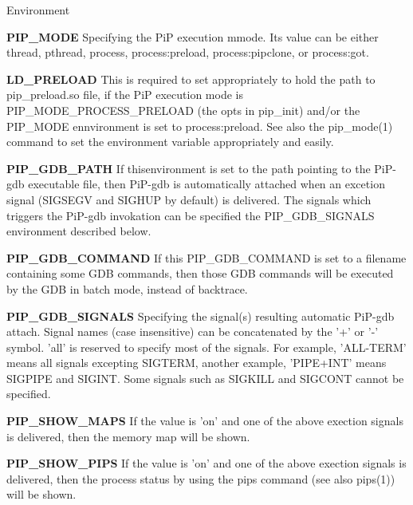 \documentclass[twoside]{book}
\begin{document}
\begin{DoxyParagraph}{Environment}
\begin{DoxyItemize}
\item {\bfseries P\-I\-P\-\_\-\-M\-O\-D\-E} Specifying the Pi\-P execution mmode. Its value can be either {\ttfamily thread}, {\ttfamily pthread}, {\ttfamily process}, {\ttfamily process\-:preload}, {\ttfamily process\-:pipclone}, or {\ttfamily process\-:got}. \item {\bfseries L\-D\-\_\-\-P\-R\-E\-L\-O\-A\-D} This is required to set appropriately to hold the path to {\ttfamily pip\-\_\-preload.\-so} file, if the Pi\-P execution mode is {\ttfamily P\-I\-P\-\_\-\-M\-O\-D\-E\-\_\-\-P\-R\-O\-C\-E\-S\-S\-\_\-\-P\-R\-E\-L\-O\-A\-D} (the {\ttfamily opts} in {\ttfamily pip\-\_\-init}) and/or the P\-I\-P\-\_\-\-M\-O\-D\-E ennvironment is set to {\ttfamily process\-:preload}. See also the pip\-\_\-mode(1) command to set the environment variable appropriately and easily. \item {\bfseries P\-I\-P\-\_\-\-G\-D\-B\-\_\-\-P\-A\-T\-H} If thisenvironment is set to the path pointing to the Pi\-P-\/gdb executable file, then Pi\-P-\/gdb is automatically attached when an excetion signal (S\-I\-G\-S\-E\-G\-V and S\-I\-G\-H\-U\-P by default) is delivered. The signals which triggers the Pi\-P-\/gdb invokation can be specified the {\ttfamily P\-I\-P\-\_\-\-G\-D\-B\-\_\-\-S\-I\-G\-N\-A\-L\-S} environment described below. \item {\bfseries P\-I\-P\-\_\-\-G\-D\-B\-\_\-\-C\-O\-M\-M\-A\-N\-D} If this P\-I\-P\-\_\-\-G\-D\-B\-\_\-\-C\-O\-M\-M\-A\-N\-D is set to a filename containing some G\-D\-B commands, then those G\-D\-B commands will be executed by the G\-D\-B in batch mode, instead of backtrace. \item {\bfseries P\-I\-P\-\_\-\-G\-D\-B\-\_\-\-S\-I\-G\-N\-A\-L\-S} Specifying the signal(s) resulting automatic Pi\-P-\/gdb attach. Signal names (case insensitive) can be concatenated by the '+' or '-\/' symbol. 'all' is reserved to specify most of the signals. For example, 'A\-L\-L-\/\-T\-E\-R\-M' means all signals excepting {\ttfamily S\-I\-G\-T\-E\-R\-M}, another example, 'P\-I\-P\-E+\-I\-N\-T' means {\ttfamily S\-I\-G\-P\-I\-P\-E} and {\ttfamily S\-I\-G\-I\-N\-T}. Some signals such as S\-I\-G\-K\-I\-L\-L and S\-I\-G\-C\-O\-N\-T cannot be specified. \item {\bfseries P\-I\-P\-\_\-\-S\-H\-O\-W\-\_\-\-M\-A\-P\-S} If the value is 'on' and one of the above exection signals is delivered, then the memory map will be shown. \item {\bfseries P\-I\-P\-\_\-\-S\-H\-O\-W\-\_\-\-P\-I\-P\-S} If the value is 'on' and one of the above exection signals is delivered, then the process status by using the {\ttfamily pips} command (see also pips(1)) will be shown.\end{DoxyItemize}

\end{DoxyParagraph}
\end{document}
